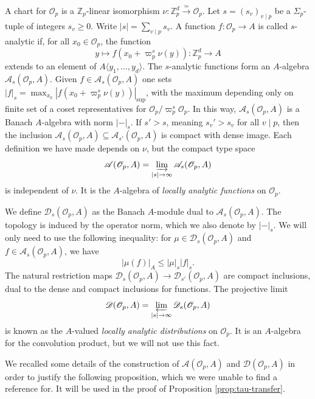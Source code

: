 \documentclass[10pt, twoside]{amsart}
\theoremstyle{plain}
\theoremstyle{definition}
\theoremstyle{remark}
\numberwithin{equation}{subsection}
\def\Z{\mathbb Z}
\def\scro{\mathscr O}
\def\scra{\mathscr A}
\def\scrd{\mathscr D}
\def\scro{\mathscr O}
\newcommand{\dirlim}{\mathop{\varinjlim}\limits}
\newcommand{\invlim}{\mathop{\varprojlim}\limits}
\begin{document}
A chart for $\scro_p$ is a $\Z_p$-linear isomorphism $\nu : \Z_p^d \xrightarrow{\simeq} \scro_p$. Let $s = (s_v)_{v \mid p}$ be a $\Sigma_p$-tuple of integers $s_v \geq 0$. Write $|s| = \sum_{v \mid p} s_v$. A function $f : \scro_p \rightarrow A$ is called $s$-analytic if, for all $x_0 \in \scro_p$, the function 
$$
y \mapsto f(x_0 + \varpi_p^s\nu(y)) : \Z_p^d \longrightarrow A
$$ 
extends to an element of $A\langle y_1,\dotsc,y_d\rangle$. The $s$-analytic functions form an $A$-algebra $\scra_s(\scro_p,A)$. Given $f \in \scra_s(\scro_p,A)$ one sets $|f|_s = \max_{x_0} |f(x_0+\varpi_p^s\nu(y))|_{\sup}$, with the maximum depending only on finite set of a coset representatives for $\scro_p/\varpi_p^s\scro_p$. In this way, $\scra_s(\scro_p,A)$ is a Banach $A$-algebra with norm $|-|_s$. If $s' > s$, meaning $s_v' > s_v$ for all $v \mid p$, then the inclusion $\scra_{s}(\scro_p,A) \subseteq \scra_{s'}(\scro_p,A)$ is compact with dense image. Each definition we have made depends on $\nu$, but the compact type space
$$
\scra(\scro_p,A) = \dirlim_{|s|\rightarrow \infty} \scra_s(\scro_p,A)
$$
is independent of $\nu$. It is the $A$-algebra of \emph{locally analytic functions} on $\scro_p$.

We define $\scrd_s(\scro_p,A)$ as the Banach $A$-module dual to $\scra_s(\scro_p,A)$. The topology is induced by the operator norm, which we also denote by $|-|_s$. We will only need to use the following inequality: 
for $\mu \in \scrd_s(\scro_p,A)$ and $f \in \scra_s(\scro_p,A)$, we have 
\begin{equation}\label{eqn:operator-norm}
|\mu(f)|_A \leq |\mu|_s |f|_s.
\end{equation}
The natural restriction maps $\scrd_{s}(\scro_p,A) \rightarrow \scrd_{s'}(\scro_p,A)$ are compact inclusions, dual to the dense and compact inclusions for functions. The projective limit
$$
\scrd(\scro_p,A) = \invlim_{|s| \rightarrow \infty} \scrd_s(\scro_p,A)
$$
is known as the $A$-valued \emph{locally analytic distributions} on $\scro_p$. It is an $A$-algebra for the convolution product, but we will not use this fact. 

We recalled some details of the construction of $\scra(\scro_p,A)$ and $\scrd(\scro_p,A)$ in order to justify the following proposition, which we were unable to find a reference for. It will be used in the proof of Proposition \ref{prop:tau-transfer}.
\end{document}
